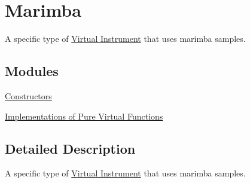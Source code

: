 \hypertarget{group___doc_mar}{}\section{Marimba}
\label{group___doc_mar}


A specific type of \hyperlink{group___v_i}{Virtual Instrument} that uses marimba samples.  


\subsection*{Modules}
\begin{DoxyCompactItemize}
\item 
\hyperlink{group___mar_construct}{Constructors}
\item 
\hyperlink{group___mar_virt_func}{Implementations of Pure Virtual Functions}
\end{DoxyCompactItemize}


\subsection{Detailed Description}
A specific type of \hyperlink{group___v_i}{Virtual Instrument} that uses marimba samples. 

